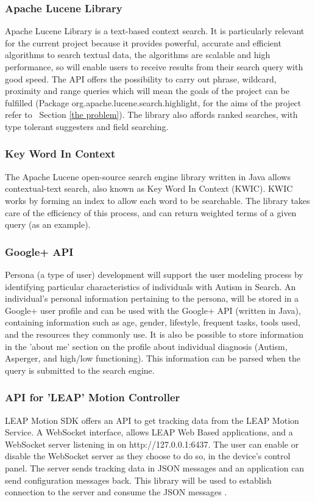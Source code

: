 \documentclass[10pt]{article}
\begin{document}
\subsubsection{Apache Lucene Library}\label{apache}
Apache Lucene Library is a text-based context search. It is particularly relevant for the current project because it provides powerful, accurate and efficient algorithms to search textual data, the algorithms are scalable and high performance, so will enable users to receive results from their search query with good speed. The API offers the possibility to carry out phrase, wildcard, proximity and range queries which will mean the goals of the project can be fulfilled (Package org.apache.lucene.search.highlight, for the aims of the project refer to ~Section \ref{the problem}). The library also affords ranked searches, with type tolerant suggesters and field searching.

\subsubsection{Key Word In Context} \label{KWIC} 
The Apache Lucene open-source search engine library written in Java allows contextual-text search, also known as Key Word In Context (KWIC)\cite{kwic}. KWIC works by forming an index to allow each word to be searchable. The library takes care of the efficiency of this process, and can return weighted terms of a given query (as an example).


\subsubsection{Google+ API}
Persona (a type of user) development will support the user modeling process by identifying particular characteristics of individuals with Autism in Search. An individual’s personal information pertaining to the persona, will be stored in a Google+ user profile and can be used with the Google+ API (written in Java), containing information such as age, gender, lifestyle, frequent tasks, tools used, and the resources they commonly use. It is also be possible to store information in the 'about me' section on the profile about individual diagnosis (Autism, Asperger, and high/low functioning). This information can be parsed when the query is submitted to the search engine.

\subsubsection{API for 'LEAP' Motion Controller}
LEAP Motion SDK offers an API to get tracking data from the LEAP Motion Service. A WebSocket interface, allows LEAP Web Based applications, and a WebSocket server listening in on http://127.0.0.1:6437. The user can enable or disable the WebSocket server as they choose to do so, in the device's control panel.
The server sends tracking data in JSON messages and an application can send configuration messages back. This library will be used to establish connection to the server and consume the JSON messages \cite{leap}. 
\end{document}
